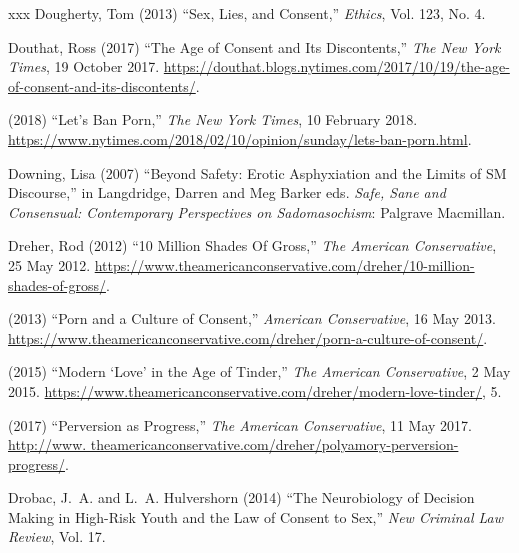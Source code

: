 \documentclass[]{jlreq} \usepackage{mystyle}
\begin{document}
\begin{thebibliography}{xxx}
Dougherty, Tom (2013) ``Sex, Lies, and Consent,'' \textit{ Ethics}, Vol. 123,
  No. 4.

Douthat, Ross (2017) ``The Age of Consent and Its Discontents,'' \emph{The New
  York Times}, 19 October 2017.
  \url{https://douthat.blogs.nytimes.com/2017/10/19/the-age-of-consent-and-its-discontents/}.

 \bysame{}  (2018) ``Let's Ban Porn,'' \emph{The New York Times}, 10 February
  2018.
  \url{https://www.nytimes.com/2018/02/10/opinion/sunday/lets-ban-porn.html}.

Downing, Lisa (2007) ``Beyond Safety: Erotic Asphyxiation and the Limits of SM
  Discourse,'' in Langdridge, Darren and Meg Barker eds.   \textit{ Safe, Sane
  and Consensual: Contemporary Perspectives on Sadomasochism}: Palgrave
  Macmillan.

Dreher, Rod (2012) ``10 Million Shades Of Gross,'' \emph{The American
  Conservative}, 25 May 2012.
  \url{https://www.theamericanconservative.com/dreher/10-million-shades-of-gross/}.

 \bysame{}  (2013) ``Porn and a Culture of Consent,'' \emph{American
  Conservative}, 16 May 2013.
  \url{https://www.theamericanconservative.com/dreher/porn-a-culture-of-consent/}.

 \bysame{}  (2015) ``Modern `Love' in the Age of Tinder,'' \emph{The American
  Conservative}, 2 May 2015.
  \url{https://www.theamericanconservative.com/dreher/modern-love-tinder/}, 5.

 \bysame{}  (2017) ``Perversion as Progress,'' \emph{The American
  Conservative}, 11 May 2017. \url{http://www.
  theamericanconservative.com/dreher/polyamory-perversion-progress/}.

Drobac, J.~A. and L.~A. Hulvershorn (2014) ``The Neurobiology of Decision
  Making in High-Risk Youth and the Law of Consent to Sex,'' \textit{ New
  Criminal Law Review}, Vol. 17.


\end{thebibliography}
\end{document}
